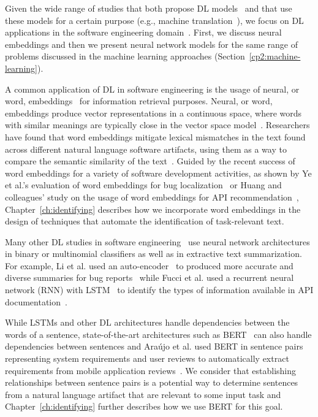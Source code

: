 Given the wide range of studies that both propose \acs{DL} models~\cite{aa} and that use 
these models for a certain purpose (e.g., machine translation~\cite{lopez2008translation}), 
we focus
on \acs{DL} applications in the 
software engineering domain~\cite{ferreira2021, li2018deep, watson2022}.
First, we discuss neural embeddings and then we present 
neural network models 
for the same range of problems discussed in the machine learning approaches (Section~\ref{cp2:machine-learning}).






A common application of \acs{DL} in software engineering is the usage of neural, or word, embeddings~\cite{Mikolov2013}
for information retrieval purposes. 
Neural, or word, embeddings produce vector representations in a continuous space,
where words with similar meanings are typically close in the vector space model~\cite{harris1954distributional, mikolov2013efficient}. 
Researchers have found that word
embeddings mitigate lexical mismatches in the text found across different 
natural language software artifacts,
using them as a way to compare the semantic similarity of the text~\cite{mihalcea2006}.
Guided by the recent success of word embeddings 
for a variety of software development 
activities, as shown by Ye et al.'s evaluation of word embeddings
for bug localization~\cite{Ye2016}
or Huang and colleagues' study on 
the usage of word embeddings for API recommendation~\cite{Huang2018},
Chapter~\ref{ch:identifying} 
describes how we incorporate word embeddings in the 
design of techniques that automate the identification of task-relevant text. 






Many other \acs{DL} studies in software engineering~\cite{ferreira2021,li2018deep, watson2022}
use neural network architectures 
in binary or multinomial classifiers as well as in extractive text summarization.
For example, Li et al. used an auto-encoder~\cite{liou2014autoencoder}
to produced more accurate and diverse summaries 
for bug reports~\cite{li2018deep} while 
Fucci et al. used a 
recurrent neural network (\acs{RNN}) with 
\acf{LSTM}~\cite{hochreiter1997lstm}
to identify the types of information available in 
API documentation~\cite{fucci2019}.


While \acs{LSTM}s and other \acs{DL} architectures 
handle dependencies between the words of a sentence, 
state-of-the-art architectures such as \acf{BERT}~\cite{Devlin2018Bert}
can also handle dependencies between sentences
and Ara{\'u}jo et al. used \acs{BERT} in sentence pairs 
representing system requirements and user reviews 
to automatically extract requirements from 
mobile application reviews~\cite{Araujo2021}.
We consider that 
establishing relationships 
between sentence pairs is 
a potential way to determine 
sentences from a natural language artifact 
that are relevant to some input task 
and Chapter~\ref{ch:identifying}
further describes how 
we use \acs{BERT} for this goal.

